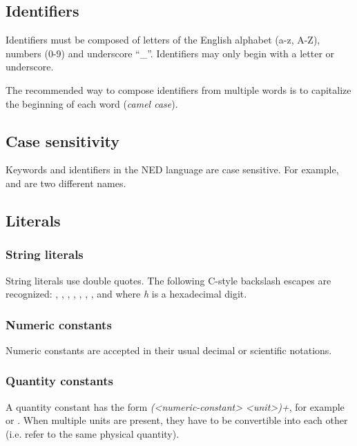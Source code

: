 \subsection{Identifiers}

Identifiers must be composed of letters of the English alphabet (a-z, A-Z),
numbers (0-9) and underscore ``\_''. Identifiers may only begin with a
letter or underscore.

The recommended way to compose identifiers from multiple words is to
capitalize the beginning of each word (\textit{camel case}).

\subsection{Case sensitivity}

Keywords and identifiers in the NED language are case sensitive. For example,
 and  are two different names.

\subsection{Literals}

\subsubsection{String literals}

String literals use double quotes. The following C-style backslash
escapes are recognized: , , , ,
, \ttt{{\textbackslash}{\textbackslash}}, , and  where \textit{h} is a
hexadecimal digit.

\subsubsection{Numeric constants}

Numeric constants are accepted in their usual decimal or
scientific notations.

\subsubsection{Quantity constants}

A quantity constant has the form \textit{(<numeric-constant> <unit>)+}, for
example  or . When multiple units are present,
they have to be convertible into each other (i.e. refer to the same physical
quantity).

